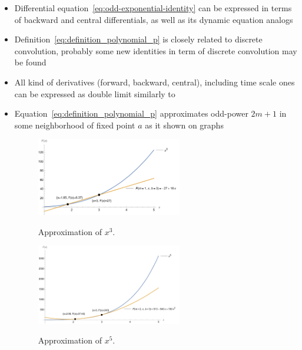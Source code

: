 ﻿\begin{itemize}
    \item Differential equation~\eqref{eq:odd-exponential-identity} can be expressed in terms of backward
    and central differentials, as well as its dynamic equation analogs~\cite{kolosov2016study}
    \item Definition~\eqref{eq:definition_polynomial_p} is closely related to discrete convolution, probably
    some new identities in term of discrete convolution may be found
    \item All kind of derivatives (forward, backward, central), including time scale ones can be expressed
    as double limit similarly to~\cite{kolosov_2024_10575485}
    \item Equation~\eqref{eq:definition_polynomial_p} approximates odd-power $2m+1$ in some neighborhood of fixed point
    $a$ as it shown on graphs
    \begin{figure}[H]
        \centering
        \includegraphics[width=0.6\textwidth]{images/n^3_approximation_m1_b3}
        ~\caption{Approximation of $x^3$.}\label{fig:approximation-n3}
    \end{figure}
    \begin{figure}[H]
        \centering
        \includegraphics[width=0.6\textwidth]{images/n^5_approximation_m2_b3}
        ~\caption{Approximation of $x^5$.}\label{fig:approximation-n5}
    \end{figure}
\end{itemize}
